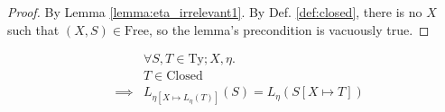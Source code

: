 \documentclass{llncs}
\newcommand*{\Ty}{\mathrm{Ty}}
\newcommand*{\Free}{\mathrm{Free}}
\newcommand*{\Closed}{\mathrm{Closed}}
\renewcommand*{\|}{\;|\;}
\begin{document}
\begin{proof}
  By Lemma \ref{lemma:eta_irrelevant1}. By Def. \ref{def:closed}, there
  is no $X$ such that $(X, S) \in \Free$, so the lemma's precondition
  is vacuously true.
\end{proof}


\begin{lemma}
  \label{lemma:substitution_trace_language}
  \begin{eqnarray*}
    &&         \forall S, T \in \Ty; X, \eta. \\
    &&         T \in \Closed \\
    &\implies& L_{\eta[X \mapsto L_\eta(T)]}(S) = L_\eta(S[X \mapsto T])
  \end{eqnarray*}
\end{lemma}
\end{document}
